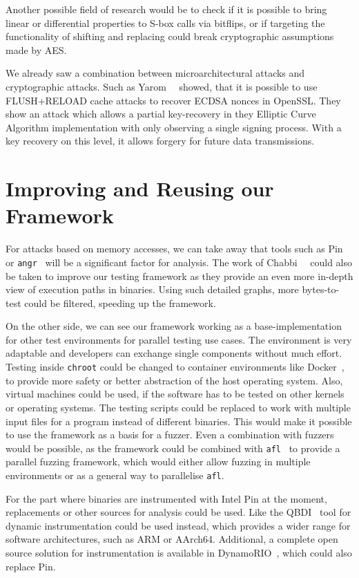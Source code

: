 Another possible field of research would be to check if it is possible to bring
linear or differential properties to S-box calls via bitflips, or if targeting
the functionality of shifting and replacing could break cryptographic
assumptions made by AES.

We already saw a combination between microarchitectural attacks and
cryptographic attacks. Such as Yarom~\etal~\cite{noncerec} showed, that it is
possible to use FLUSH+RELOAD cache attacks to recover ECDSA nonces in OpenSSL.
They show an attack which allows a partial key-recovery in they Elliptic Curve
Algorithm implementation with only observing a single signing process. With a
key recovery on this level, it allows forgery for future data transmissions.

\section{Improving and Reusing our Framework}

For attacks based on memory accesses, we can take away that tools such as
Pin~\cite{pintool} or \texttt{angr}~\cite{angrpaper} will be a significant
factor for analysis. The work of Chabbi~\etal~\cite{pincallpaths} could also be
taken to improve our testing framework as they provide an even more in-depth
view of execution paths in binaries. Using such detailed graphs, more
bytes-to-test could be filtered, speeding up the framework.

On the other side, we can see our framework working as a base-implementation for
other test environments for parallel testing use cases. The environment is very
adaptable and developers can exchange single components without much effort.
Testing inside \texttt{chroot} could be changed to container environments like
Docker~\cite{docker}, to provide more safety or better abstraction of the host
operating system. Also, virtual machines could be used, if the software has to
be tested on other kernels or operating systems. The testing scripts could be
replaced to work with multiple input files for a program instead of different
binaries. This would make it possible to use the framework as a basis for a
fuzzer. Even a combination with fuzzers would be possible, as the framework
could be combined with \texttt{afl}~\cite{aflweb} to provide a parallel fuzzing
framework, which would either allow fuzzing in multiple environments or as a
general way to parallelise \texttt{afl}.

For the part where binaries are instrumented with Intel Pin at the moment,
replacements or other sources for analysis could be used. Like the
QBDI~\cite{qbdi} tool for dynamic instrumentation could be used instead, which
provides a wider range for software architectures, such as ARM or AArch64.
Additional, a complete open source solution for instrumentation is available in
DynamoRIO~\cite{dynrio}, which could also replace Pin.

